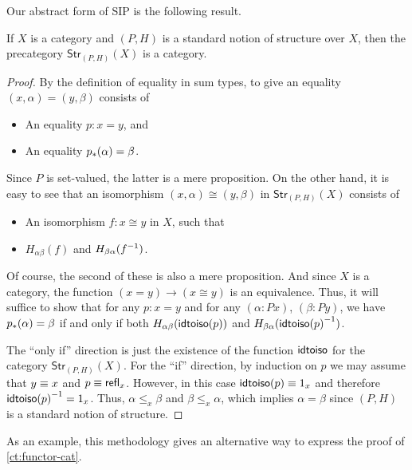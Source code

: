 Our abstract form of SIP is the following result.

\begin{thm}\label{thm:sip}
  If $X$ is a category and $(P,H)$ is a standard notion of structure over $X$, then the precategory $\mathsf{Str}_{(P,H)}(X)$ is a category.
\end{thm}
\begin{proof}
  By the definition of equality in sum types, to give an equality $(x,\alpha)=(y,\beta)$ consists of
  \begin{itemize}
  \item An equality $p:x=y$, and
  \item An equality ${p}_{*}\mathopen{}\left({\alpha}\right)\mathclose{}=\beta$.
  \end{itemize}
  Since $P$ is set-valued, the latter is a mere proposition.
  On the other hand, it is easy to see that an isomorphism $(x,\alpha)\cong (y,\beta)$ in $\mathsf{Str}_{(P,H)}(X)$ consists of
  \begin{itemize}
  \item An isomorphism $f:x\cong y$ in $X$, such that
  \item $H_{\alpha\beta}(f)$ and $H_{\beta\alpha}({f}^{-1})$.
  \end{itemize}
  Of course, the second of these is also a mere proposition.
  And since $X$ is a category, the function $(x=y) \to (x\cong y)$ is an equivalence.
  Thus, it will suffice to show that for any $p:x=y$ and for any $(\alpha:Px)$, $(\beta:Py)$, we have ${p}_{*}\mathopen{}\left({\alpha}\right)\mathclose{}=\beta$ if and only if both  $H_{\alpha\beta}(\mathsf{idtoiso} (p))$ and $H_{\beta\alpha}({\mathsf{idtoiso}(p)}^{-1})$.

  The ``only if'' direction is just the existence of the function $\mathsf{idtoiso}$ for the category $\mathsf{Str}_{(P,H)}(X)$.
  For the ``if'' direction, by induction on $p$ we may assume that $y\equiv x$ and $p\equiv\mathsf{refl}_{x}$.
  However, in this case $\mathsf{idtoiso} (p)\equiv 1_x$ and therefore ${\mathsf{idtoiso}(p)}^{-1}=1_x$.
  Thus, $\alpha\leq_x \beta$ and $\beta\leq_x \alpha$, which implies $\alpha=\beta$ since $(P,H)$ is a standard notion of structure.
\end{proof}

As an example, this methodology gives an alternative way to express the proof of \autoref{ct:functor-cat}.

